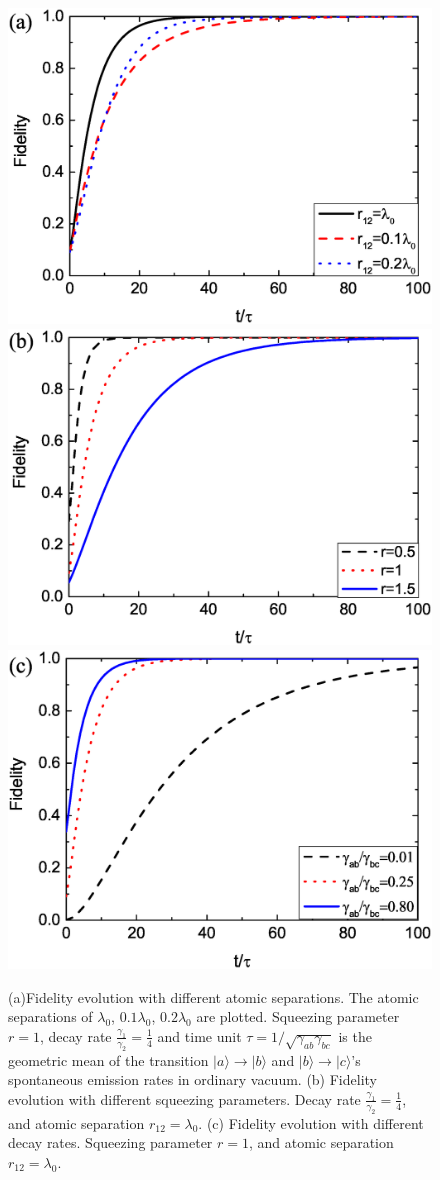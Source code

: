 \documentclass[aps,showpacs,twocolumn,twoside,groupedaddress]{revtex4}
\begin{document}
\begin{figure}
\includegraphics[width=0.66\columnwidth]{fig4a.eps}
\includegraphics[width=0.66\columnwidth]{fig4b.eps}
\includegraphics[width=0.66\columnwidth]{fig4c.eps}
\caption{(a)Fidelity evolution with different atomic separations. The atomic separations of $\lambda_0$, $0.1\lambda_0$, $0.2\lambda_0$ are plotted. Squeezing parameter $r=1$, decay rate $\frac{\gamma_1}{\gamma_2}=\frac{1}{4}$ and time unit $\tau=1/\sqrt{\gamma_{ab}\gamma_{bc}}$ is the geometric mean of the transition $|a\rangle\rightarrow|b\rangle$ and $|b\rangle\rightarrow|c\rangle$'s spontaneous emission rates in ordinary vacuum. (b) Fidelity evolution with different squeezing parameters. Decay rate $\frac{\gamma_1}{\gamma_2}=\frac{1}{4}$, and atomic separation $r_{12}=\lambda_0$. (c) Fidelity evolution with different decay rates. Squeezing parameter $r=1$, and atomic separation $r_{12}=\lambda_0$. }
\label{3}
\end{figure}
\end{document}
